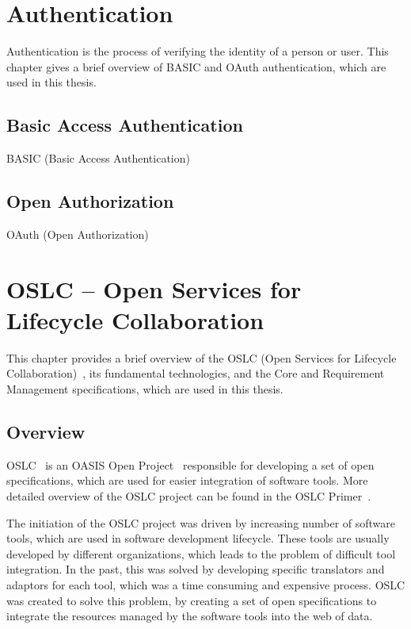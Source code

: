 
\chapter{Authentication}
\label{chapter:authentication}
Authentication is the process of verifying the identity of a person or user. This chapter gives a brief overview of BASIC and OAuth authentication, which are used in this thesis.

\section{Basic Access Authentication}
BASIC (Basic Access Authentication) \cite{basic_auth_rfc}

\section{Open Authorization}
OAuth (Open Authorization)   \cite{oauth2_rfc}


\chapter{OSLC -- Open Services for Lifecycle Collaboration}
This chapter provides a brief overview of the OSLC (Open Services for Lifecycle Collaboration) \cite{oslc}, its fundamental technologies, and the Core and Requirement Management specifications, which are used in this thesis.

\section{Overview}
OSLC \cite{oslc} is an OASIS Open Project \cite{oasis_open} responsible for developing a set of open specifications, which are used for easier integration of software tools. More detailed overview of the OSLC project can be found in the OSLC Primer \cite{oslc_primer}.

The initiation of the OSLC project was driven by increasing number of software tools, which are used in software development lifecycle. These tools are usually developed by different organizations, which leads to the problem of difficult tool integration. In the past, this was solved by developing specific translators and adaptors for each tool, which was a time consuming and expensive process. OSLC was created to solve this problem, by creating a set of open specifications to integrate the resources managed by the software tools into the web of data.

